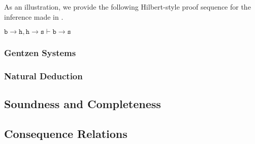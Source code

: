 As an illustration, we provide the following Hilbert-style proof sequence for the inference made in . 

\begin{theorem}
     $\texttt{b} \rightarrow \texttt{h}, \texttt{h} \rightarrow \texttt{s} \vdash \texttt{b} \rightarrow \texttt{s}$
\end{theorem}  

\begin{proofH}
\end{proofH} 

\subsubsection{Gentzen Systems} 
\label{subsubsection:gentzen-systems}

\subsubsection{Natural Deduction} 
\label{subsubsection:natural-deduction}

\subsection{Soundness and Completeness} 
\label{subsection:soundness-and-completeness}
 

\subsection{Consequence Relations} 
\label{subsection:consequence-relations}


